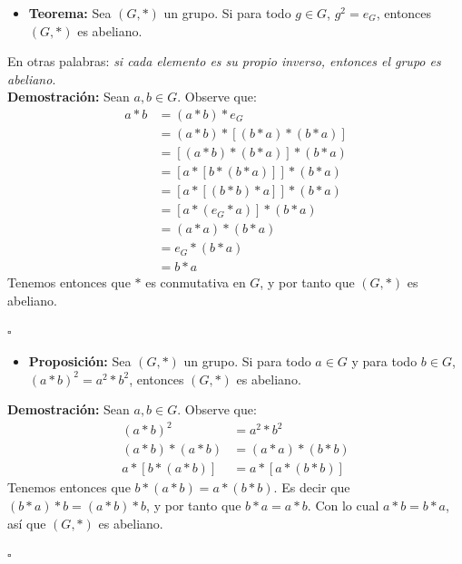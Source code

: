 \documentclass[10 pt]{article}
\begin{document}
\begin{itemize}
    \item \Large{\textbf{Teorema:} Sea $(G,*)$ un grupo. Si para todo $g \in G$, $g^{2}=e_G$, entonces $(G,*)$ es abeliano.} \\
\end{itemize}

\Large{En otras palabras: \textit{si cada elemento es su propio inverso, entonces el grupo es abeliano}.} \\

\Large{\textbf{Demostración:} Sean $a,b \in G$. Observe que:}
\begin{align*}
    a*b&=(a*b)*e_G \\
    &=(a*b)*[(b*a)*(b*a)] \\
    &=[(a*b)*(b*a)]*(b*a) \\
    &=[a*[b*(b*a)]]*(b*a) \\
    &=[a*[(b*b)*a]]*(b*a) \\
    &=[a*(e_G*a)]*(b*a) \\
    &=(a*a)*(b*a) \\
    &=e_G*(b*a) \\
    &=b*a
\end{align*}
\Large{Tenemos entonces que $*$ es conmutativa en $G$, y por tanto que $(G,*)$ es abeliano.} \\

\begin{flushright}
    $\square$
\end{flushright}

\begin{itemize}
    \item \Large{\textbf{Proposición:} Sea $(G,*)$ un grupo. Si para todo $a \in G$ y para todo $b \in G$, $(a*b)^2=a^2*b^2$, entonces $(G,*)$ es abeliano.} \\
\end{itemize}

\Large{\textbf{Demostración:} Sean $a,b \in G$. Observe que:} 
\begin{align*}
    (a*b)^2&=a^2*b^2 \\
    (a*b)*(a*b)&=(a*a)*(b*b) \\
    a*[b*(a*b)]&=a*[a*(b*b)]
\end{align*}
\Large{Tenemos entonces que $b*(a*b)=a*(b*b)$. Es decir que $(b*a)*b=(a*b)*b$, y por tanto que $b*a=a*b$. Con lo cual $a*b=b*a$, así que $(G,*)$ es abeliano.} \\

\begin{flushright}
    $\square$
\end{flushright}
\end{document}
